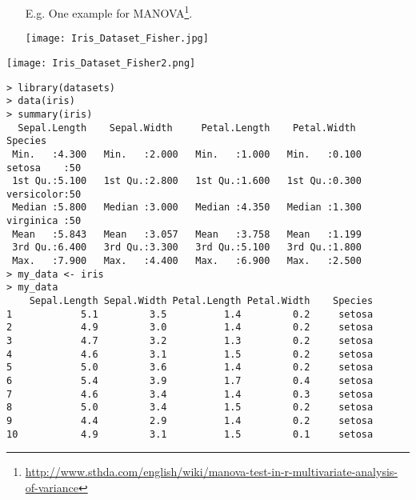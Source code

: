 \begin{frame}[fragile]
\begin{itemize}
\item[E.g.] One example for MANOVA\footnote{\url{http://www.sthda.com/english/wiki/manova-test-in-r-multivariate-analysis-of-variance}}.
\vfill
\begin{center}
\texttt{[image: Iris\_Dataset\_Fisher.jpg]}
\end{center}
\end{itemize}
\end{frame}
\begin{frame}[fragile]
\begin{center}
\texttt{[image: Iris\_Dataset\_Fisher2.png]}
\end{center}
\end{frame}
\begin{frame}[fragile]
\begin{center}
\begin{minipage}{0.8\textwidth}
\begin{lstlisting}
> library(datasets)
> data(iris)
> summary(iris)
  Sepal.Length    Sepal.Width     Petal.Length    Petal.Width          Species
 Min.   :4.300   Min.   :2.000   Min.   :1.000   Min.   :0.100   setosa    :50
 1st Qu.:5.100   1st Qu.:2.800   1st Qu.:1.600   1st Qu.:0.300   versicolor:50
 Median :5.800   Median :3.000   Median :4.350   Median :1.300   virginica :50
 Mean   :5.843   Mean   :3.057   Mean   :3.758   Mean   :1.199
 3rd Qu.:6.400   3rd Qu.:3.300   3rd Qu.:5.100   3rd Qu.:1.800
 Max.   :7.900   Max.   :4.400   Max.   :6.900   Max.   :2.500
> my_data <- iris
> my_data
    Sepal.Length Sepal.Width Petal.Length Petal.Width    Species
1            5.1         3.5          1.4         0.2     setosa
2            4.9         3.0          1.4         0.2     setosa
3            4.7         3.2          1.3         0.2     setosa
4            4.6         3.1          1.5         0.2     setosa
5            5.0         3.6          1.4         0.2     setosa
6            5.4         3.9          1.7         0.4     setosa
7            4.6         3.4          1.4         0.3     setosa
8            5.0         3.4          1.5         0.2     setosa
9            4.4         2.9          1.4         0.2     setosa
10           4.9         3.1          1.5         0.1     setosa
\end{lstlisting}
\end{minipage}
\end{center}
\end{frame}
